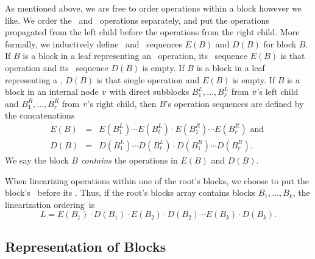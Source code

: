 As mentioned above, we are free to order operations within a block however we like.
We order the \enqueue\ and \dequeue\ operations separately, and put the 
operations propagated from the left child before the operations from the right child.
More formally, we inductively define \enqueue\ and \dequeue\ sequences $E(B)$ and $D(B)$
for block $B$.
If $B$ is a block in a leaf representing an \enqueue\ operation, its \enqueue\ sequence $E(B)$ is that operation
and its \dequeue\ sequence $D(B)$ is empty.  If $B$ is a block in a leaf representing a \dequeue, $D(B)$ is that single operation and $E(B)$ is empty.
If $B$ is a block in an internal node $\mbox{\textnormal{\textit{v}}}$ with direct subblocks $B^L_1, \ldots, B^L_\ell$ from 
$\mbox{\textnormal{\textit{v}}}$'s left child
and $B^R_1,\ldots,B^R_r$ from $\mbox{\textnormal{\textit{v}}}$'s right child, then $B$'s operation sequences are defined by the concatenations 
\begin{eqnarray}
E(B) &=& E(B^L_1)\cdots E(B^L_\ell)\cdot E(B^R_1) \cdots E(B^R_r) \mbox{ and }\nonumber\\
D(B) &=& D(B^L_1)\cdots D(B^L_\ell)\cdot D(B^R_1) \cdots D(B^R_r).
\label{defSeqs}
\end{eqnarray}
We say the block $B$ \emph{contains} the operations in $E(B)$ and $D(B)$.

When linearizing operations within one of the root's blocks, we choose
to put the block's \enqueues\ before its \dequeues.
Thus, if the root's blocks array contains blocks $B_1, \ldots, B_k$, the 
linearization ordering~is 
\begin{equation}
L=E(B_1)\cdot D(B_1) \cdot E(B_2) \cdot D(B_2) \cdots E(B_k) \cdot D(B_k).\label{linearization}
\end{equation}

\subsection{Representation of Blocks}
\label{sec:fields}

